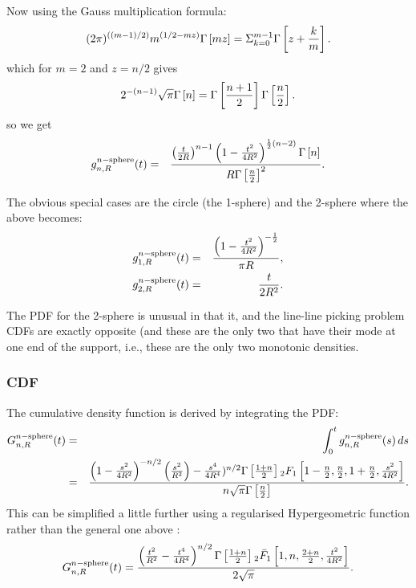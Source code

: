 Now using the Gauss multiplication formula: 
\begin{equation}
(2\pi)^{((m-1)/2)}m^{(1/2-mz)} \Gamma\left[mz\right]=\Sigma_{k=0}^{m-1}\Gamma\left[z+\frac{k}{m}\right].  \nonumber \\ 
\end{equation}
which for $m = 2$ and $z = n/2$ gives
\begin{equation}
 2^{-(n-1)}\sqrt{ \pi } \Gamma\left[n\right]=\Gamma\left[\frac{n+1}{2}\right] \Gamma\left[\frac{n}{2}\right].   \nonumber \\ 
\end{equation}
so we get
\begin{eqnarray}
  g^{n-{\rm sphere}}_{n,R}(t)
    & = & \frac{\left(\frac{t}{2R} \right)^{n-1}
             \left(1 -\frac{t^2}{4 R^2}\right)^{\frac{1}{2} (n-2)}\Gamma\left[n\right]}
             { R \Gamma\left[\frac{n}{2}\right]^2}.
  \label{eq:nsphere_pdf_phi}
\end{eqnarray}


The obvious special cases are the circle (the 1-sphere) and the 2-sphere where the
above becomes:
\begin{eqnarray}
  g^{n-{\rm sphere}}_{1,R}(t) 
   & = &\frac{\left(1 -\frac{t^2}{4 R^2}\right)^{-\frac{1}{2}}}{\pi R}, \\
  g^{n-{\rm sphere}}_{2,R}(t) 
   & = &\frac{t}{2 R^2}.
\end{eqnarray}

The PDF for the 2-sphere is unusual in that it, and the line-line
picking problem CDFs are exactly opposite (and these are the only two
that have their mode at one end of the support, i.e., these are the
only two monotonic densities.



\subsubsection{CDF}

The cumulative density function is derived by integrating the PDF:
\begin{eqnarray}
G^{n-{\rm sphere}}_{n,R}(t)
       & = & \int_0^t g^{n-{\rm sphere}}_{n,R}(s) \, ds \nonumber \\
       & = & \frac{ \left(1-\frac{s^2}{4 R^2}\right)^{-n/2} 
                    \left( \frac{s^2}{R^2} \right)
                   -\frac{s^4}{4 R^4})^{n/2} 
                    \Gamma \left[\frac{1+n}{2}\right] {}_{2}F_{1} 
                    \left[ 1-\frac{n}{2},\frac{n}{2},1+\frac{n}{2},\frac{s^2}{4 R^2} \right]
                  }{n \sqrt{\pi } \Gamma \left[ \frac{n}{2} \right] }.
\end{eqnarray}
This can be simplified a little further using a regularised
Hypergeometric function rather than the general one above :
\begin{equation}
G^{n-{\rm sphere}}_{n,R}(t) = 
      \frac{\left(\frac{t^2}{R^2} -\frac{t^4}{4 R^4}\right)^{n/2}
            \Gamma\left[\frac{1+n}{2}\right]
             {}_{2}\bar{F}_{1}\left[1,n,\frac{2+n}{2},\frac{t^2}{4
                 R^2}\right]
           }{2 \sqrt{\pi }}.
\end{equation}


